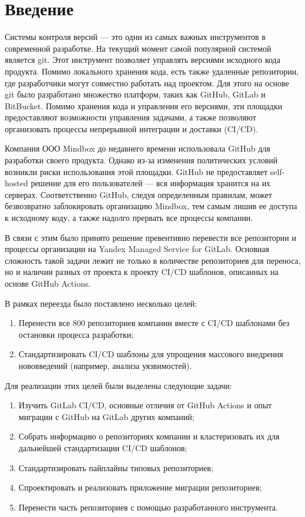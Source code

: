 \chapter*{Введение}

Системы контроля версий — это одни из самых важных инструментов в современной разработке.
На текущий момент самой популярной системой является git.
Этот инструмент позволяет управлять версиями исходного кода продукта.
Помимо локального хранения кода, есть также удаленные репозитории, где разработчики могут совместно работать над проектом.
Для этого на основе git было разработано множество платформ, таких как GitHub, GitLab и BitBucket.
Помимо хранения кода и управления его версиями, эти площадки предоставляют возможности управления задачами,
а также позволяют организовать процессы непрерывной интеграции и доставки (CI/CD).

Компания ООО Mindbox до недавнего времени использовала GitHub для разработки своего продукта.
Однако из-за изменения политических условий возникли риски использования этой площадки.
GitHub не предоставляет self-hosted решение для его пользователей — вся информация хранится на их серверах.
Соответственно GitHub, следуя определенным правилам, может безвозвратно заблокировать организацию Mindbox,
тем самым лишив ее доступа к исходному коду, а также надолго прервать все процессы компании.

В связи с этим было принято решение превентивно перевести все репозитории и процессы организации на Yandex Managed Service for GitLab.
Основная сложность такой задачи лежит не только в количестве репозиториев для переноса,
но и наличии разных от проекта к проекту CI/CD шаблонов, описанных на основе GitHub Actions.

В рамках переезда было поставлено несколько целей:
\begin{enumerate}
  \item Перенести все 800 репозиториев компании вместе с CI/CD шаблонами без остановки процесса разработки;
  \item Стандартизировать CI/CD шаблоны для упрощения массового внедрения нововведений (например, анализа уязвимостей).
\end{enumerate}

Для реализации этих целей были выделены следующие задачи:
\begin{enumerate}
  \item Изучить GitLab CI/CD, основные отличия от GitHub Actions и опыт миграции с GitHub на GitLab других компаний;
  \item Собрать информацию о репозиториях компании и кластеризовать их для дальнейшей стандартизации CI/CD шаблонов;
  \item Стандартизировать пайплайны типовых репозиториев;
  \item Спроектировать и реализовать приложение миграции репозиториев;
  \item Перенести часть репозиториев с помощью разработанного инструмента.
\end{enumerate}
